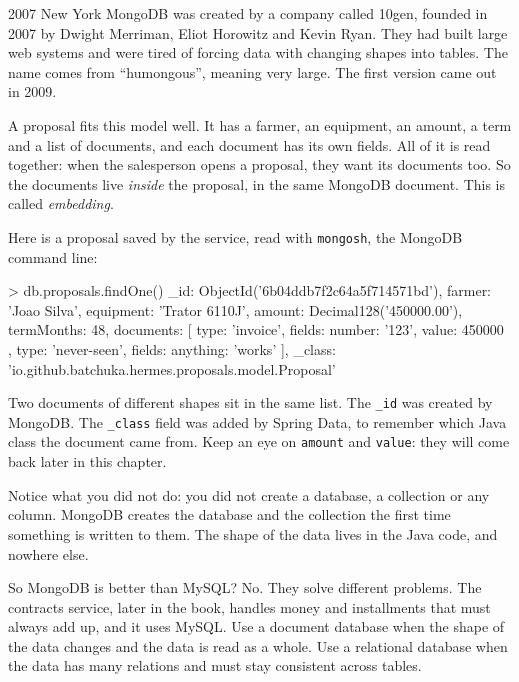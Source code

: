\begin{history}{2007 \textperiodcentered{} New York}
MongoDB was created by a company called 10gen, founded in 2007 by Dwight
Merriman, Eliot Horowitz and Kevin Ryan. They had built large web systems and
were tired of forcing data with changing shapes into tables. The name comes
from ``humongous'', meaning very large. The first version came out in 2009.
\end{history}

A proposal fits this model well. It has a farmer, an equipment, an amount, a
term and a list of documents, and each document has its own fields. All of it
is read together: when the salesperson opens a proposal, they want its
documents too. So the documents live \emph{inside} the proposal, in the same
MongoDB document. This is called \emph{embedding}.

Here is a proposal saved by the service, read with \texttt{mongosh}, the
MongoDB command line:

\begin{terminal}
> db.proposals.findOne()
{
  _id: ObjectId('6b04ddb7f2c64a5f714571bd'),
  farmer: 'Joao Silva',
  equipment: 'Trator 6110J',
  amount: Decimal128('450000.00'),
  termMonths: 48,
  documents: [
    { type: 'invoice', fields: { number: '123', value: 450000 } },
    { type: 'never-seen', fields: { anything: 'works' } }
  ],
  _class: 'io.github.batchuka.hermes.proposals.model.Proposal'
}
\end{terminal}

Two documents of different shapes sit in the same list. The \texttt{\_id} was
created by MongoDB. The \texttt{\_class} field was added by Spring Data, to
remember which Java class the document came from. Keep an eye on
\texttt{amount} and \texttt{value}: they will come back later in this chapter.

Notice what you did not do: you did not create a database, a collection or
any column. MongoDB creates the database and the collection the first time
something is written to them. The shape of the data lives in the Java code,
and nowhere else.

\begin{question}{So MongoDB is better than MySQL?}
No. They solve different problems. The contracts service, later in the book,
handles money and installments that must always add up, and it uses MySQL.
Use a document database when the shape of the data changes and the data is
read as a whole. Use a relational database when the data has many relations
and must stay consistent across tables.
\end{question}

